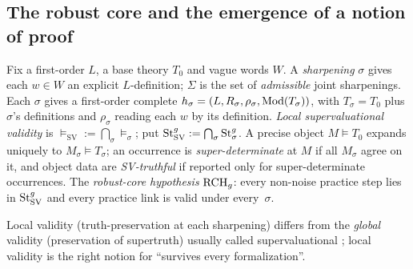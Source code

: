 \subsection{The robust core and the emergence of a notion of proof}\label{sec:informal:robust}

\begin{definition}\label{def:informal:sharpening}
Fix a first-order $L$, a base theory $T_0$ and vague words $W$. A \emph{sharpening} $\sigma$ gives each $w\in W$ an explicit $L$-definition; $\Sigma$ is the set of \emph{admissible} joint sharpenings. Each $\sigma$ gives a first-order complete $h_\sigma=(L,R_\sigma,\rho_\sigma,\mathrm{Mod}(T_\sigma))$, with $T_\sigma=T_0$ plus $\sigma$'s definitions and $\rho_\sigma$ reading each $w$ by its definition. \emph{Local supervaluational validity} is ${\models_{\mathrm{SV}}}:=\bigcap_\sigma{\models_\sigma}$; put $\mathrm{St}^{g}_{\mathrm{SV}}:=\bigcap_\sigma\mathrm{St}^{g}_{\sigma}$. A precise object $M\models T_0$ expands uniquely to $M_\sigma\models T_\sigma$; an occurrence is \emph{super-determinate} at $M$ if all $M_\sigma$ agree on it, and object data are \emph{SV-truthful} if reported only for super-determinate occurrences. The \emph{robust-core hypothesis} $\mathrm{RCH}_g$: every non-noise practice step lies in $\mathrm{St}^{g}_{\mathrm{SV}}$ and every practice link is valid under every~$\sigma$.
\end{definition}

Local validity (truth-preservation at each sharpening) differs from the \emph{global} validity (preservation of supertruth) usually called supervaluational \citep{fine1975vagueness,williamson1994vagueness,keefe2000theories,varzi2007supervaluationism}; local validity is the right notion for ``survives every formalization''.

